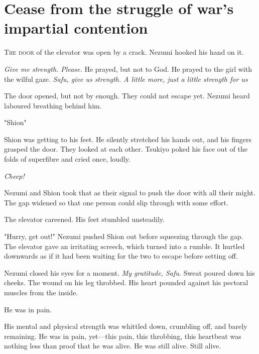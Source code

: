 
\chapter{Cease from the struggle of war's impartial contention}


\lettrine{T}{he door} of the elevator was open by a crack. Nezumi hooked his hand on
it.

\emph{Give me strength. Please.} He prayed, but not to God. He prayed to the
girl with the wilful gaze. \emph{Safu, give us strength. A little more, just a
little strength for us\el }

The door opened, but not by enough. They could not escape yet. Nezumi
heard laboured breathing behind him.

"Shion\el "

Shion was getting to his feet. He silently stretched his hands out, and
his fingers grasped the door. They looked at each other. Tsukiyo poked
his face out of the folds of superfibre and cried once, loudly.

\emph{Cheep!}

Nezumi and Shion took that as their signal to push the door with all
their might. The gap widened so that one person could slip through with
some effort.

The elevator careened. His feet stumbled unsteadily.

"Hurry, get out!" Nezumi pushed Shion out before squeezing through the
gap. The elevator gave an irritating screech, which turned into a
rumble. It hurtled downwards as if it had been waiting for the two to
escape before setting off.

Nezumi closed his eyes for a moment. \emph{My gratitude, Safu.} Sweat poured
down his cheeks. The wound on his leg throbbed. His heart pounded
against his pectoral muscles from the inside.

He was in pain.

His mental and physical strength was whittled down, crumbling off, and
barely remaining. He was in pain, yet---this pain, this throbbing, this
heartbeat was nothing less than proof that he was alive. He was still
alive. Still alive.

